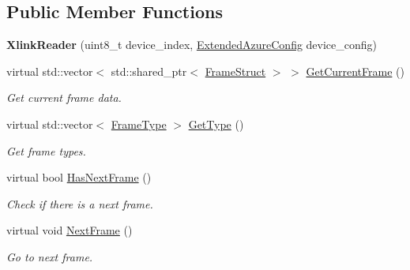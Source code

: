 \subsection*{Public Member Functions}
\begin{DoxyCompactItemize}
\item 
\mbox{\label{classmoetsi_1_1ssp_1_1XlinkReader_aa3b2c527364818fb268139a96b06ef31}} 
{\bfseries Xlink\+Reader} (uint8\+\_\+t device\+\_\+index, \hyperlink{structmoetsi_1_1ssp_1_1ExtendedAzureConfig}{Extended\+Azure\+Config} device\+\_\+config)
\item 
\mbox{\label{classmoetsi_1_1ssp_1_1XlinkReader_a5ed11b9db4d54e1adb1d1bcc5cb2a468}} 
virtual std\+::vector$<$ std\+::shared\+\_\+ptr$<$ \hyperlink{structmoetsi_1_1ssp_1_1FrameStruct}{Frame\+Struct} $>$ $>$ \hyperlink{classmoetsi_1_1ssp_1_1XlinkReader_a5ed11b9db4d54e1adb1d1bcc5cb2a468}{Get\+Current\+Frame} ()
\begin{DoxyCompactList}\small\item\em Get current frame data. \end{DoxyCompactList}\item 
virtual std\+::vector$<$ \hyperlink{namespacemoetsi_1_1ssp_a46efdfa2cd5a28ead465dcc8006b5a87}{Frame\+Type} $>$ \hyperlink{classmoetsi_1_1ssp_1_1XlinkReader_a2119c9bc9e4929ff37115a7be463eb92}{Get\+Type} ()
\begin{DoxyCompactList}\small\item\em Get frame types. \end{DoxyCompactList}\item 
virtual bool \hyperlink{classmoetsi_1_1ssp_1_1XlinkReader_ab57ff571372fbbe18f4f5f96e4bc7c21}{Has\+Next\+Frame} ()
\begin{DoxyCompactList}\small\item\em Check if there is a next frame. \end{DoxyCompactList}\item 
\mbox{\label{classmoetsi_1_1ssp_1_1XlinkReader_a6a6e6685a97396f138f0a3e6da0603d7}} 
virtual void \hyperlink{classmoetsi_1_1ssp_1_1XlinkReader_a6a6e6685a97396f138f0a3e6da0603d7}{Next\+Frame} ()
\begin{DoxyCompactList}\small\item\em Go to next frame. \end{DoxyCompactList}\item 

\end{DoxyCompactItemize}
